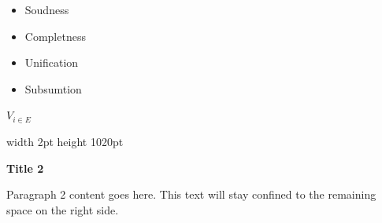 \documentclass{article}
\begin{document}
\pagestyle{empty} %
\fontsize{40pt}{52pt}\selectfont

\begin{minipage}[t][1080pt]{1400pt}
    \vspace{40pt}\hspace{40pt}%
    \begin{minipage}{1320pt}%

        \begin{itemize}
            \item Soudness
            \item Completness
            \item Unification
            \item Subsumtion
        \end{itemize}
        $V_{i \in E}$
    \end{minipage}
\end{minipage}%
%
\begin{minipage}[t][1080pt]{20pt}
    \vspace*{20pt}
    \color{blue}\vrule width 2pt height 1020pt
\end{minipage}%
%
\begin{minipage}[t][1080pt]{500pt}
    \vspace{40pt}\hspace{20pt}%
    \begin{minipage}{430pt}%
        {\Large\bfseries Title 2}\par\vspace{0.5cm}
        Paragraph 2 content goes here. This text will stay confined to the 
        remaining space on the right side.
    \end{minipage}
\end{minipage}
\end{document}

